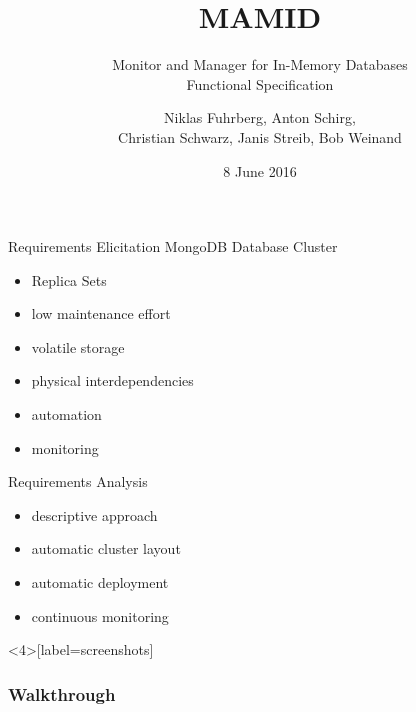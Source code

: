 \documentclass[11pt,aspectratio=169]{beamer}
\begin{document}
	\author{Niklas Fuhrberg, Anton Schirg,\\ Christian Schwarz, Janis Streib, Bob Weinand}
	\title{MAMID}
	\subtitle{Monitor and Manager for In-Memory Databases\\Functional Specification}
	\date{8 June 2016}
	\subject{Functional Specification}
	\frame[plain]{\maketitle}
	
	\begin{frame}{Requirements Elicitation}
		MongoDB Database Cluster
		\begin{itemize}
			\item Replica Sets
			\item low maintenance effort
			\item volatile storage
			\item physical interdependencies
			\item automation
			\item monitoring
		\end{itemize}
	\end{frame}
	
	
	\begin{frame}{Requirements Analysis}
		\begin{itemize}
			\item descriptive approach
			\item automatic cluster layout
			\item automatic deployment
			\item continuous monitoring
		\end{itemize}
	\end{frame}
	
	\begin{frame}[label=screenshots]
		\frametitle{Walkthrough}
		\begin{center}
		\end{center}
	\end{frame}
	
\end{document}
